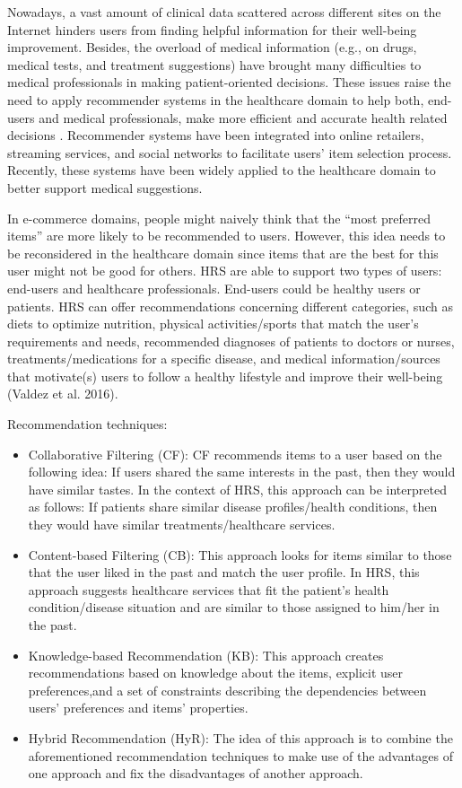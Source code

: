 \cite{the_shift_project_plan_2021}

Nowadays, a vast amount of clinical data scattered across different sites on the Internet hinders users from finding helpful information for their well-being improvement. Besides, the overload of medical information (e.g., on drugs, medical tests, and treatment suggestions) have brought many difficulties to medical professionals in making patient-oriented decisions. These issues raise the need to apply recommender systems in the healthcare domain to help both, end-users and medical professionals, make more efficient and accurate health related decisions \cite{tran_recommender_2021}. Recommender systems have been integrated into online retailers, streaming services, and social networks to facilitate users' item selection process. Recently, these systems have been widely applied to the healthcare domain to better support medical suggestions.

In e-commerce domains, people might naively think that the ``most preferred items'' are more likely to be recommended to users. However, this idea needs to be reconsidered in the healthcare domain since items that are the best for this user might not be good for others. HRS are able to support two types of users: end-users and healthcare professionals. End-users could be healthy users or patients. HRS can offer recommendations concerning different categories, such as diets to optimize nutrition, physical activities/sports that match the user's requirements and needs, recommended diagnoses of patients to doctors or nurses, treatments/medications for a specific disease, and medical information/sources that motivate(s) users to follow a healthy lifestyle and improve their well-being (Valdez et al. 2016).

Recommendation techniques:

\begin{itemize}
    \item Collaborative Filtering (CF): CF recommends items to a user based on the following idea: If users shared the same interests in the past, then they would have similar tastes. In the context of HRS, this approach can be interpreted as follows: If patients share similar disease profiles/health conditions, then they would have similar treatments/healthcare services.
    \item Content-based Filtering (CB): This approach looks for items similar to those that the user liked in the past and match the user profile. In HRS, this approach suggests healthcare services that fit the patient's health condition/disease situation and are similar to those assigned to him/her in the past.
    \item Knowledge-based Recommendation (KB): This approach creates recommendations based on knowledge about the items, explicit user preferences,and a set of constraints describing the dependencies between users' preferences and items' properties.
    \item Hybrid Recommendation (HyR): The idea of this approach is to combine the aforementioned recommendation techniques to make use of the advantages of one approach and fix the disadvantages of another approach.
\end{itemize}

